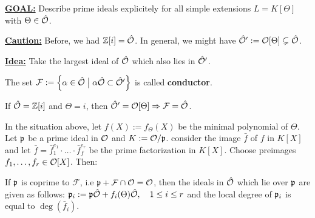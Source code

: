 \bigskip

\textbf{\underline{GOAL:}} Describe prime ideals explicitely for all simple extensions $L = K[\Theta]$ with $\Theta \in \hat{\mathcal{O}}$.

\textbf{\underline{Caution:}} Before, we had $\mathbb{Z}[i] = \hat{\mathcal{O}}$. In general, we might have $\hat{\mathcal{O}}' := \mathcal{O}[\Theta] \subsetneq \hat{\mathcal{O}}$.

\textbf{\underline{Idea:}} Take the largest ideal of $\hat{\mathcal{O}}$ which also lies in $\hat{\mathcal{O}}'$.

\begin{defi}
	The set $\mathcal F := \left\{ {\alpha \in \hat{\mathcal{O}}} \bigm| {\alpha\hat{\mathcal{O}} \subset \hat{\mathcal{O}}'} \right\}$ is called \textbf{conductor}.
\end{defi}

\begin{Bsp}
	If $\hat{\mathcal{O}} = \mathbb{Z}[i]$ and $\Theta = i$, then $\hat{\mathcal{O}}' = \mathcal{O}[\Theta] \Rightarrow \mathcal F = \hat{\mathcal{O}}$.
\end{Bsp}

\begin{Prop}
	In the situation above, let $f(X) := f_\Theta(X)$ be the minimal polynomial of $\Theta$. Let $\mathfrak{p}$ be a prime ideal in $\mathcal{O}$ and $K := \mathcal{O} / \mathfrak{p}$. consider the image $\bar f$ of $f$ in $K[X]$ and let $\bar f = \bar f_1^{e_1} \cdot \dots \cdot \bar f_f^{e_r}$ be the prime factorization in $K[X]$. Choose preimages $f_1, \dots, f_r \in \mathcal{O}[X]$. Then:
	
	If $\mathfrak{p}$ is coprime to $\mathcal F$, i.e $\mathfrak{p} + \mathcal F \cap \mathcal{O} = \mathcal{O}$, then the ideals in $\hat{\mathcal{O}}$ which lie over $\mathfrak{p}$ are given as follows: $\mathfrak{p}_i := \mathfrak{p}\hat{\mathcal{O}} + f_i(\Theta) \hat{\mathcal{O}}, \quad 1 \leq i \leq r$ and the local degree of $\mathfrak{p}_i$ is equal to $\deg(\bar f_i)$.
\end{Prop}